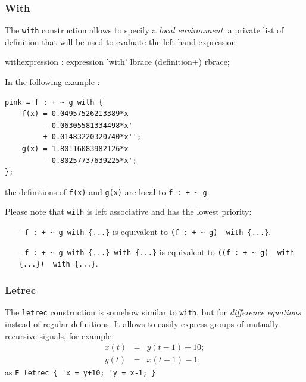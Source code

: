 \subsubsection{With} 
The \lstinline'with' construction allows to specify a \textit{local environment}, a private list of definition that will be used to evaluate the left hand expression


\begin{rail}
withexpression : expression 'with' lbrace (definition+) rbrace;
\end{rail}


In the following example :
\begin{lstlisting}
pink = f : + ~ g with {
	f(x) = 0.04957526213389*x 
		 - 0.06305581334498*x' 
         + 0.01483220320740*x'';
	g(x) = 1.80116083982126*x 
		 - 0.80257737639225*x';
};
\end{lstlisting}
the definitions of \lstinline'f(x)' and \lstinline'g(x)' are local to \lstinline'f : + ~ g'.

Please note that \lstinline'with' is left associative and has the lowest priority:
\begin{itemize} 
\item[-] \lstinline'f : + ~ g with {...}' is equivalent to \lstinline'(f : + ~ g)  with {...}'. 
\item[-] \lstinline'f : + ~ g with {...} with {...}' is equivalent to \lstinline'((f : + ~ g)  with {...})  with {...}'. 
\end{itemize}

\subsubsection{Letrec} 
The \lstinline'letrec' construction is somehow similar to \lstinline'with', but for   \emph{difference equations} instead of regular definitions. It allows to easily express groups of mutually recursive signals, for example:
\begin{eqnarray*}
x(t)&=&y(t-1)+10;\\
y(t)&=&x(t-1)-1;
\end{eqnarray*}
as \lstinline|E letrec { 'x = y+10; 'y = x-1; }|	

